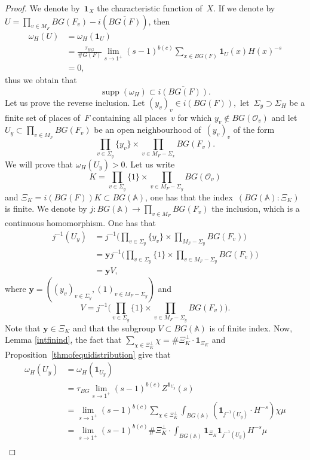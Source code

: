 \documentclass[a4paper,english,12pt]{amsart}
\newcommand{\Ov}{\mathcal O _v}
\newcommand{\vMF}{v\in M_F}
\newcommand{\AAA}{\mathbb A}
\newcommand{\yyy}{\mathbf{y}}
\DeclareMathOperator{\supp}{supp}
\numberwithin{equation}{subsection}
\begin{document}
\begin{proof}
We denote by~$\mathbf 1_X$ the characteristic function of~$X$. If we denote by $U=\prod_{\vMF}BG(F_v)-i(\overline{BG(F)})$, then \begin{align*}\omega_H(U)&=\omega_H(\mathbf 1_U)\\&=\frac{\tau_{BG}}{\# G(F)}\lim_{s\to 1^+}{(s-1)^{b(c)}}\sum_{x\in BG(F)}\mathbf{1}_U(x)H(x)^{-s}\\&=0,
\end{align*}
thus we obtain that $$\supp(\omega_H)\subset\overline{i(BG(F))}.$$ 
Let us prove the reverse inclusion. Let $(y_v)_v\in i(BG(F)),$ let~$\Sigma_y\supset\Sigma_H$ be a finite set of places of~$F$ containing all places~$v$ for which $y_v\not\in BG(\Ov)$ and let $U_y\subset\prod_{\vMF}BG(F_v)$ be an open neighbourhood of~$(y_v)_v$ of the form $$\prod_{v\in\Sigma_y}\{y_v\}\times \prod_{v\in M_F-\Sigma_x}BG(F_v) .$$   We will prove that $\omega_H(U_y)>0$.  Let us write $$K=\prod_{v\in\Sigma_y}\{1\}\times\prod_{v\in M_F-\Sigma_y}BG(\Ov)$$ and $\Xi_K=i(BG(F))K\subset BG(\AAA)$, one has that the index~$(BG(\AAA):\Xi_K)$ is finite.  We denote by $j:BG(\AAA)\to \prod_{\vMF}BG(F_v)$ the inclusion, which is a continuous homomorphism. One has that 
\begin{align*}j^{-1}(U_y)&=j^{-1}\bigg(\prod_{v\in\Sigma_y}\{y_v\}\times \prod_{M_F-\Sigma_y}BG(F_v)\bigg)\\&=\yyy j^{-1}\bigg(\prod_{v\in\Sigma_y}\{1\}\times\prod_{v\in M_F-\Sigma_y}BG(F_v)\bigg)\\
&=\yyy V,
\end{align*}
where $\yyy=((y_v)_{v\in \Sigma_y},(1)_{v\in M_F-\Sigma_y})$ and $$V=j^{-1}\bigg(\prod_{v\in\Sigma_y}\{1\}\times\prod_{v\in M_F-\Sigma_y}BG(F_v)\bigg).$$ Note that $\yyy\in\Xi_K$ and that the subgroup $V\subset BG(\AAA)$ is of finite index. %
Now, Lemma \ref{intfinind}, the fact that $\sum_{\chi\in\Xi_K^{\perp}}\chi=\#\Xi_K^{\perp}\cdot\mathbf{1}_{\Xi_K}$ and Proposition~\ref{thmofequidistribution} give that
\begin{align*}
\omega_H(U_y)&=\omega_H(\mathbf{1}_{U_y})\\
&=\tau_{BG}\lim_{s\to 1^+}(s-1)^{b(c)}Z^{\mathbf{1}_{U_y}}(s)\\
&=\lim_{s\to 1^+}(s-1)^{b(c)}\sum_{\chi\in\Xi_K^{\perp}}\int_{BG(\AAA)}(\mathbf 1_{j^{-1}(U_y)}\cdot H^{-s})\chi\mu\\
&=\lim_{s\to 1^+}(s-1)^{b(c)}\#\Xi_K^{\perp}\cdot \int_{BG(\AAA)}\mathbf 1_{\Xi_K}\mathbf 1_{j^{-1}(U_y)}H^{-s}\mu\\

\end{align*}
\end{proof}
\end{document}
